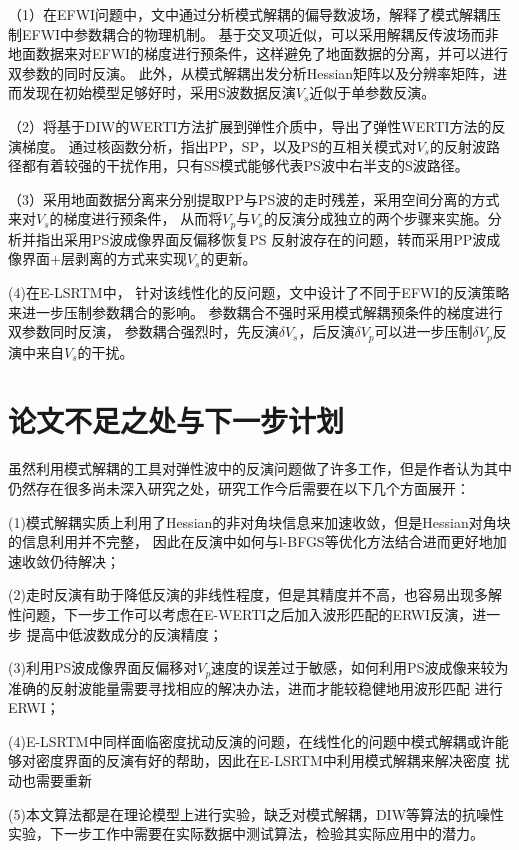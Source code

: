 （1）在EFWI问题中，文中通过分析模式解耦的偏导数波场，解释了模式解耦压制EFWI中参数耦合的物理机制。
基于交叉项近似，可以采用解耦反传波场而非地面数据来对EFWI的梯度进行预条件，这样避免了地面数据的分离，并可以进行双参数的同时反演。
此外，从模式解耦出发分析Hessian矩阵以及分辨率矩阵，进而发现在初始模型足够好时，采用S波数据反演$V_s$近似于单参数反演。

（2）将基于DIW的WERTI方法扩展到弹性介质中，导出了弹性WERTI方法的反演梯度。
通过核函数分析，指出PP，SP，以及PS的互相关模式对$V_s$的反射波路径都有着较强的干扰作用，只有SS模式能够代表PS波中右半支的S波路径。

（3）采用地面数据分离来分别提取PP与PS波的走时残差，采用空间分离的方式来对$V_s$的梯度进行预条件，
从而将$V_p$与$V_s$的反演分成独立的两个步骤来实施。分析并指出采用PS波成像界面反偏移恢复PS
反射波存在的问题，转而采用PP波成像界面+层剥离的方式来实现$V_s$的更新。

(4)在E-LSRTM中，
针对该线性化的反问题，文中设计了不同于EFWI的反演策略来进一步压制参数耦合的影响。
参数耦合不强时采用模式解耦预条件的梯度进行双参数同时反演，
参数耦合强烈时，先反演$\delta V_s$，后反演$\delta V_p$可以进一步压制$\delta
V_p$反演中来自$V_s$的干扰。

\section{论文不足之处与下一步计划}
虽然利用模式解耦的工具对弹性波中的反演问题做了许多工作，但是作者认为其中仍然存在很多尚未深入研究之处，研究工作今后需要在以下几个方面展开：

(1)模式解耦实质上利用了Hessian的非对角块信息来加速收敛，但是Hessian对角块的信息利用并不完整，
因此在反演中如何与l-BFGS等优化方法结合进而更好地加速收敛仍待解决；

(2)走时反演有助于降低反演的非线性程度，但是其精度并不高，也容易出现多解性问题，下一步工作可以考虑在E-WERTI之后加入波形匹配的ERWI反演，进一步
提高中低波数成分的反演精度；

(3)利用PS波成像界面反偏移对$V_p$速度的误差过于敏感，如何利用PS波成像来较为准确的反射波能量需要寻找相应的解决办法，进而才能较稳健地用波形匹配
进行ERWI；

(4)E-LSRTM中同样面临密度扰动反演的问题，在线性化的问题中模式解耦或许能够对密度界面的反演有好的帮助，因此在E-LSRTM中利用模式解耦来解决密度
扰动也需要重新

(5)本文算法都是在理论模型上进行实验，缺乏对模式解耦，DIW等算法的抗噪性实验，下一步工作中需要在实际数据中测试算法，检验其实际应用中的潜力。
